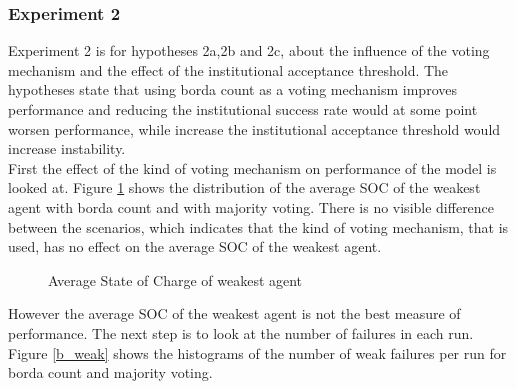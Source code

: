 \documentclass[a4paper]{article}
\begin{document}
\subsubsection{Experiment 2}
Experiment 2 is for hypotheses 2a,2b and 2c, about the influence of the voting mechanism and the effect of the institutional acceptance 
threshold. The hypotheses state that using borda count as a voting mechanism improves performance and reducing the institutional success 
rate would at some point worsen performance, while increase the institutional acceptance threshold would increase instability.\\
First the effect of the kind of voting mechanism on performance of the model is looked at.
Figure \ref{b_average} shows the distribution of the average SOC of the weakest agent with borda count and with majority 
voting. There is no visible difference between the scenarios, which indicates that the kind of voting mechanism, that 
is used, has no  effect on the average SOC of the weakest agent. \\ 
\begin{figure}[!ht]
\caption{Average State of Charge of weakest agent}
\label{b_average}
\end{figure}
However the average SOC of the weakest agent is not the best measure of performance.
The next step is to look at the number of failures in each run.
Figure \ref{b_weak} shows the histograms of the number of weak failures per run for borda count and majority voting. 
\end{document}
